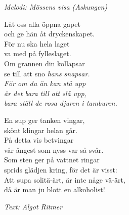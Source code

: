 {\footnotesize\textit{Melodi: Mössens visa (Askungen)}}\par
\vspace{10pt}
Låt oss alla öppna gapet\\
och ge hän åt dryckenskapet.\\
För nu ska hela laget\\
va med på fylleslaget.\\
Om grannen din kollapsar\\
se till att sno \it{hans} snapsar.\\
För om du än kan stå upp\\
är det bara till att slå upp,\\
bara ställ de rosa djuren i tamburen.\par
\vspace{10pt}
En sup ger tanken vingar,\\
skönt klingar helan går.\\
På detta vis betvingar\\
vår ångest som nyss var så svår.\\
Som sten ger på vattnet ringar\\
sprids glädjen kring, för det är visst:\\
Att supa solitä-ärt, är inte någe vä-ärt,\\
då är man ju blott en alkoholist!\\
\par
\vspace{10pt}
{\footnotesize\textit{Text: Algot Ritmer}}
